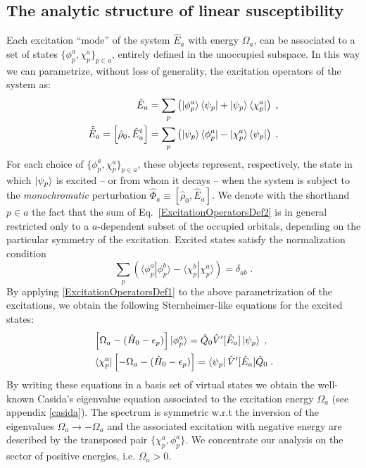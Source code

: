\documentclass[reprint,aps,prb]{revtex4-1}
\newcommand{\eps}{\epsilon}
\newcommand{\be}{\begin{equation}}
\newcommand{\ee}{\end{equation}}
\newcommand{\nn}{\notag}
\newcommand{\lb}{\label}
\newcommand{\op}[1]{\hat {#1}}
\newcommand{\commutator}[2]{\left[ {#1} , {#2} \right]}
\newcommand{\brket}[2]{\langle  #1 | #2 \rangle} %
\newcommand{\dmnot}{\op{\rho}_0}
\newcommand{\hnot}{\op{H}_0}
\begin{document}
\subsection{The analytic structure of linear susceptibility}
Each excitation ``mode'' of the system $\op E_a$ with energy $\Omega_a$, can be associated to a set of states $\{\phi^a_p,\chi^a_p\}_{p \in a}$,
entirely defined in the unoccupied subspace.
In this way we can parametrize, without loss of generality, the excitation operators of the system as:
\begin{align}\lb{ExcitationOperatorsDef2}
\op E_a &= \sum_p \left( \ket{\phi^a_p}\bra{\psi_p} + \ket{\psi_p} \bra{\chi^a_p}\right)\;, \nn \\
\op{\tilde E}_a = \commutator{\dmnot}{\op E^t_a} &= \sum_p \left( \ket{\psi_p}\bra{\phi^a_p} - \ket{\chi^a_p} \bra{\psi_p}\right)\;.
\end{align}
For each choice of $\{\phi^a_p,\chi^a_p\}_{p \in a}$, these objects represent, respectively, the state in which $\ket{\psi_p}$
is excited -- or from whom it decays -- when the system is subject to the \emph{monochromatic} perturbation $\op \Phi_a \equiv \commutator{\dmnot}{\op E_a}$.
We denote with the shorthand $p \in a$ the fact that the sum of Eq.~\eqref{ExcitationOperatorsDef2}
is in general restricted only to a $a$-dependent subset of the occupied orbitals, depending on the particular symmetry
of the excitation.
Excited states  satisfy the normalization condition
\be\lb{ExcitedStateOrthNormDef1}
\sum_p \left(\brket{\phi_p^a}{\phi_p^b} - \brket{\chi_p^b}{\chi_p^a}\right) = \delta_{ab} \;.
\ee
By applying \eqref{ExcitationOperatorsDef1} to the above parametrization
of the excitations, we obtain the following Sternheimer-like equations for the excited states:
\begin{align}\lb{ExcitationOperatorsDef3}
&\left[\Omega_a-(\hnot - \eps_p)\right] \ket{\phi_p^a} = \op Q_0 \op V'[\op E_a] \ket{\psi_p} \;, \nn\\
&\bra{\chi_p^a}\left[-\Omega_a-(\hnot - \eps_p)\right] = \bra{\psi_p} \op V'[\op E_a] \op Q_0  \;.
\end{align}
By writing these equations in a basis set of virtual states we obtain the well-known Casida's eigenvalue equation\cite{CasidaBook}
associated to the excitation energy $\Omega_a$ (see appendix \ref{casida}).
The spectrum is symmetric w.r.t the inversion of the eigenvalues
$\Omega_a \rightarrow -\Omega_a$ and the associated excitation with negative energy are described by the transposed pair $\{\chi^a_p,\phi^a_p\}$.
We concentrate our analysis on the sector of positive energies, i.e. $\Omega_a > 0$.
\end{document}
